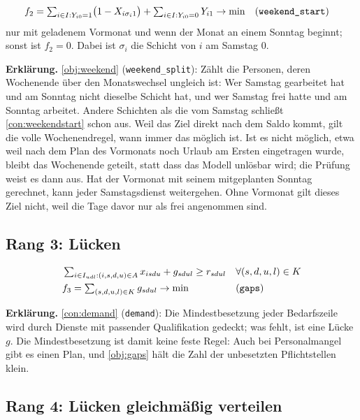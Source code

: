 \documentclass[11pt]{combiArticle}
\newcommand{\code}[1]{\texttt{#1}}
\begin{document}
\begin{align}
  & f_2 = \textstyle\sum_{i \in I : Y_{i0} = 1} \bigl(1 - X_{i\sigma_i 1}\bigr) + \sum_{i \in I : Y_{i0} = 0} Y_{i1} \to \min
    && \text{(\code{weekend\_start})} \label{obj:weekend}
\end{align}
nur mit geladenem Vormonat und wenn der Monat an einem Sonntag beginnt; sonst ist $f_2 = 0$. Dabei ist $\sigma_i$ die
Schicht von $i$ am Samstag $0$.

\textbf{Erklärung.}
\eqref{obj:weekend} (\code{weekend\_split}): Zählt die Personen, deren Wochenende über den Monatswechsel ungleich
ist: Wer Samstag gearbeitet hat und am Sonntag nicht dieselbe Schicht hat, und wer Samstag frei hatte und am Sonntag
arbeitet. Andere Schichten als die vom Samstag schließt \eqref{con:weekendstart} schon aus. Weil das Ziel direkt
nach dem Saldo kommt, gilt die volle Wochenendregel, wann immer das möglich ist. Ist es nicht möglich, etwa weil
nach dem Plan des Vormonats noch Urlaub am Ersten eingetragen wurde, bleibt das Wochenende geteilt, statt dass das
Modell unlösbar wird; die Prüfung weist es dann aus. Hat der Vormonat mit seinem mitgeplanten Sonntag gerechnet,
kann jeder Samstagsdienst weitergehen. Ohne Vormonat gilt dieses Ziel nicht, weil die Tage davor nur als frei
angenommen sind.

\subsection{Rang 3: Lücken}\label{sec:z:luecken}

\begin{align}
  & \textstyle\sum_{i \in I_{udl} : (i,s,d,u) \in A} x_{isdu} + g_{sdul} \ge r_{sdul} && \forall (s,d,u,l) \in K \label{con:demand}\\
  & f_3 = \textstyle\sum_{(s,d,u,l) \in K} g_{sdul} \to \min && \text{(\code{gaps})} \label{obj:gaps}
\end{align}

\textbf{Erklärung.}
\eqref{con:demand} (\code{demand}): Die Mindestbesetzung jeder Bedarfszeile wird durch Dienste mit passender
Qualifikation gedeckt; was fehlt, ist eine Lücke $g$. Die Mindestbesetzung ist damit keine feste Regel: Auch bei
Personalmangel gibt es einen Plan, und \eqref{obj:gaps} hält die Zahl der unbesetzten Pflichtstellen klein.

\subsection{Rang 4: Lücken gleichmäßig verteilen}\label{sec:z:lueckenverteilung}
\end{document}

